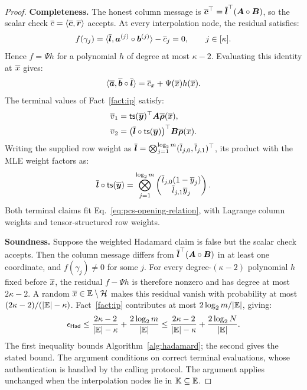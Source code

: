 \begin{proof}
\noindent\textbf{Completeness.}
The honest column message is
\(\overline{\bm c}^{\top}
=\overline{\bm l}^{\top}(\bm A\circ\bm B)\), so the scalar check
\(\overline{c}=\langle\overline{\bm c},\overline{\bm r}\rangle\) accepts.
At every interpolation node, the residual satisfies:
\[
    f(\gamma_j)
      =\langle\overline{\bm l},
          \bm a^{(j)}\circ\bm b^{(j)}\rangle-\overline{c}_j
      =0,
    \qquad j\in[\kappa].
\]
Hence \(f=\Psi h\) for a polynomial \(h\) of degree at most
\(\kappa-2\). Evaluating this identity at \(\overline{x}\) gives:
\[
    \langle\overline{\bm a},\overline{\bm b}\circ\overline{\bm l}\rangle
      =\overline{c}_x+\Psi(\overline{x})h(\overline{x}).
\]
The terminal values of Fact~\ref{fact:ip} satisfy:
\[
\begin{aligned}
    \overline{v}_1
      &={\sf ts}(\overline{\bm y})^\top
          \bm A\overline{\bm\rho}(\overline{x}),\\
    \overline{v}_2
      &=\bigl(\overline{\bm l}\circ{\sf ts}(\overline{\bm y})\bigr)^\top
          \bm B\overline{\bm\rho}(\overline{x}).
\end{aligned}
\]
Writing the supplied row weight as
\(\overline{\bm l}=\bigotimes_{j=1}^{\log_2m}
(\overline{l}_{j,0},\overline{l}_{j,1})^\top\), its product with the MLE
weight factors as:
\[
    \overline{\bm l}\circ{\sf ts}(\overline{\bm y})
      =\bigotimes_{j=1}^{\log_2m}
        \begin{pmatrix}
            \overline{l}_{j,0}(1-\overline{y}_j)\\
            \overline{l}_{j,1}\overline{y}_j
        \end{pmatrix}.
\]
Both terminal claims fit Eq.~\eqref{eq:pcs-opening-relation},
with Lagrange column weights and tensor-structured row weights.

\smallskip\noindent\textbf{Soundness.}
Suppose the weighted Hadamard claim is false but the scalar
check accepts. Then the column message differs from
\(\overline{\bm l}^{\top}(\bm A\circ\bm B)\) in at least one
coordinate, and \(f(\gamma_j)\neq0\) for some \(j\).
For every degree-\((\kappa-2)\) polynomial \(h\) fixed before
\(\overline{x}\), the residual \(f-\Psi h\) is therefore nonzero
and has degree at most \(2\kappa-2\).
A random \(\overline{x}\in\mathbb{E}\setminus\mathcal H\)
makes this residual vanish with probability at most
\((2\kappa-2)/(|\mathbb{E}|-\kappa)\).
Fact~\ref{fact:ip} contributes at most
\(2\log_2m/|\mathbb{E}|\), giving:
\[
    \epsilon_{\mathsf{Had}}
      \leq
      \frac{2\kappa-2}{|\mathbb{E}|-\kappa}
      +\frac{2\log_2m}{|\mathbb{E}|}
      \leq
      \frac{2\kappa-2}{|\mathbb{E}|-\kappa}
      +\frac{2\log_2N}{|\mathbb{E}|}.
\]
The first inequality bounds Algorithm~\ref{alg:hadamard};
the second gives the stated bound. The argument conditions on
correct terminal evaluations, whose authentication is handled
by the calling protocol.
The argument applies unchanged when the interpolation nodes
lie in \(\mathbb K\subseteq\mathbb{E}\).


\end{proof}
